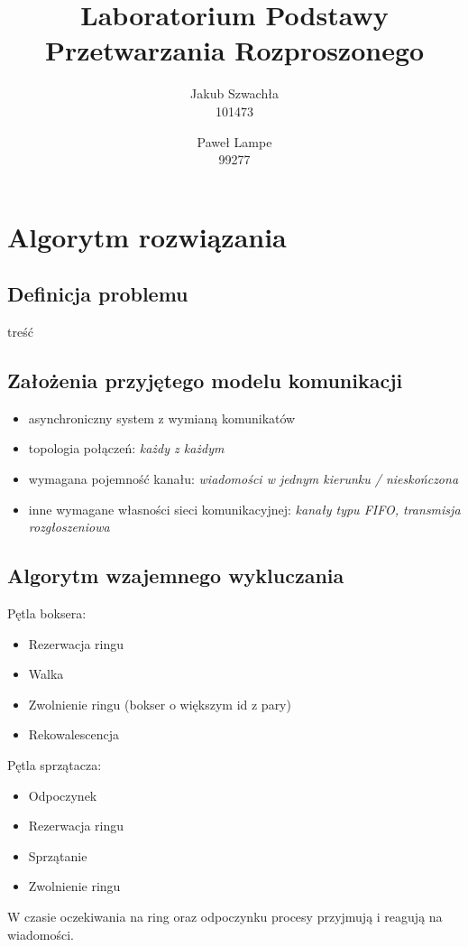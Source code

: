 \documentclass{article}
\title{\textbf{Laboratorium Podstawy Przetwarzania Rozproszonego}}
\author{Jakub Szwachła \\ 101473 \and  Paweł Lampe \\ 99277}
\begin{document}
\maketitle

\section{Algorytm rozwiązania}
\subsection{Definicja problemu}
treść

\subsection{Założenia przyjętego modelu komunikacji}
\begin{itemize}
\item asynchroniczny system z wymianą komunikatów
\item topologia połączeń: \emph{każdy z każdym}
\item wymagana pojemność kanału:  \emph{wiadomości w jednym kierunku / nieskończona}
\item inne wymagane własności sieci komunikacyjnej: \emph{kanały typu FIFO, transmisja rozgłoszeniowa}
\end{itemize}

\subsection{Algorytm wzajemnego wykluczania}

Pętla boksera:
\begin{itemize}
    \item Rezerwacja ringu
    \item Walka
    \item Zwolnienie ringu (bokser o większym id z pary)
    \item Rekowalescencja
\end{itemize}

Pętla sprzątacza:
\begin{itemize}
    \item Odpoczynek
    \item Rezerwacja ringu
    \item Sprzątanie
    \item Zwolnienie ringu
\end{itemize}

W czasie oczekiwania na ring oraz odpoczynku procesy przyjmują i reagują
na wiadomości.
\end{document}
